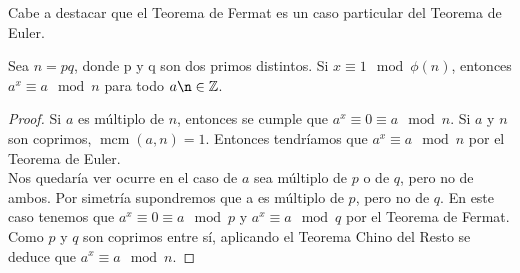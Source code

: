 Cabe a destacar que el Teorema de Fermat es un caso particular del Teorema de Euler.\\

\begin{proposicion}
	Sea $n = pq$, donde p y q son dos primos distintos. Si $x\equiv 1 \mod \phi(n)$, entonces $a^x\equiv a\mod n$ para todo $ a \n \in \mathbb{Z}$.
\end{proposicion}\vspace*{-5mm}

	\begin{proof}
		Si $a$ es múltiplo de $n$, entonces se cumple que $a^x \equiv 0 \equiv a \mod n$. Si $a$ y $n$ son coprimos, $\operatorname{mcm}(a,n) = 1$. Entonces tendríamos que $a^x \equiv a \mod n$ por el Teorema de Euler.\\
		Nos quedaría ver ocurre en el caso de $a$ sea múltiplo de $p$ o de $q$, pero no de ambos. Por simetría supondremos que a es múltiplo de $p$, pero no de $q$. En este caso tenemos que $a^x \equiv 0 \equiv a \mod p$  y $a^x \equiv a \mod q$ por el Teorema de Fermat. Como $p$ y $q$ son coprimos entre sí, aplicando el Teorema Chino del Resto se deduce que $a^x \equiv a \mod n$.\qedhere
	\end{proof}

